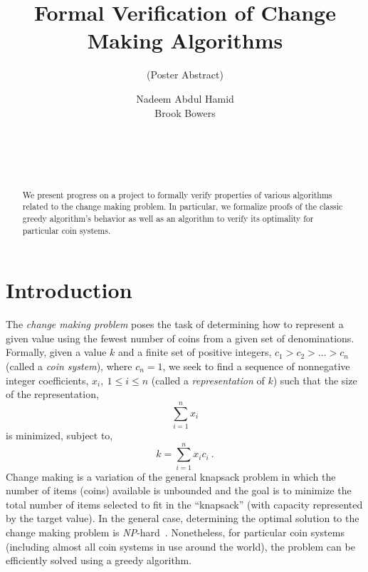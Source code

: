 \documentclass{sig-alternate}
\title{Formal Verification of Change Making Algorithms}
\subtitle{(Poster Abstract)}
\author{
\alignauthor
Nadeem Abdul Hamid\\
  \email{nadeem@acm.org}
\alignauthor
Brook Bowers\\
  \email{brook.bowers@vikings.berry.edu}
\and
  \affaddr{Berry College} \\
   \affaddr{Department of Mathematics and Computer Science}\\
  \affaddr{Mount Berry, GA 30149}\\
}
\begin{document}

\maketitle

\begin{abstract}
We present progress on a project to formally verify properties of various algorithms related to the change making problem. In particular, we formalize proofs of the  classic greedy algorithm's behavior as well as an algorithm to verify its optimality for particular coin systems.
\end{abstract}




\section{Introduction}

The \emph{change making problem} poses the task of determining how to represent a given value using the fewest number of coins from a given set of denominations. Formally, given a value $k$ and a finite set of positive integers, $c_1 > c_2 > \ldots > c_n$ (called a \emph{coin system}), where $c_n = 1$, we seek to find a sequence of nonnegative integer coefficients, $x_i,\ 1 \le i \le n$ (called a \emph{representation} of $k$) such that the size of the representation,
\[ \sum_{i=1}^{n}x_i \]
is minimized, subject to,
\[ k = \sum_{i=1}^{n}{x_i c_i}\ . \]
Change making is a variation of the general knapsack problem in which the number of items (coins) available is unbounded and the goal is to minimize the total number of items selected to fit in the ``knapsack'' (with capacity represented by the target value). In the general case, determining the optimal solution to the change making problem is \emph{NP}-hard~\cite{martello90}. Nonetheless, for particular coin systems (including almost all coin systems in use around the world), the problem can be efficiently solved using a greedy algorithm. 
\end{document}
